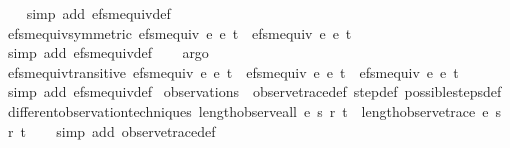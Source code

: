 \begin{isabellebody}
%
\isadelimproof
\ \ %
\endisadelimproof
%
\isatagproof
{}\isamarkupfalse%
\ {\isacharparenleft}simp\ add{\isacharcolon}\ efsm{\isacharunderscore}equiv{\isacharunderscore}def{\isacharparenright}%
\endisatagproof
{\isafoldproof}%
%
\isadelimproof
\isanewline
%
\endisadelimproof
\isanewline
{}\isamarkupfalse%
\ efsm{\isacharunderscore}equiv{\isacharunderscore}symmetric{\isacharcolon}\ {\isachardoublequoteopen}efsm{\isacharunderscore}equiv\ e{}\ e{}\ t\ {\isasymequiv}\ efsm{\isacharunderscore}equiv\ e{}\ e{}\ t{\isachardoublequoteclose}\isanewline
%
\isadelimproof
\ \ %
\endisadelimproof
%
\isatagproof
{}\isamarkupfalse%
\ {\isacharparenleft}simp\ add{\isacharcolon}\ efsm{\isacharunderscore}equiv{\isacharunderscore}def{\isacharparenright}\isanewline
\ \ \isamarkupfalse%
\ argo%
\endisatagproof
{\isafoldproof}%
%
\isadelimproof
\isanewline
%
\endisadelimproof
\isanewline
{}\isamarkupfalse%
\ efsm{\isacharunderscore}equiv{\isacharunderscore}transitive{\isacharcolon}\ {\isachardoublequoteopen}efsm{\isacharunderscore}equiv\ e{}\ e{}\ t\ {\isasymand}\ efsm{\isacharunderscore}equiv\ e{}\ e{}\ t\ {\isasymlongrightarrow}\ efsm{\isacharunderscore}equiv\ e{}\ e{}\ t{\isachardoublequoteclose}\isanewline
%
\isadelimproof
\ \ %
\endisadelimproof
%
\isatagproof
{}\isamarkupfalse%
\ {\isacharparenleft}simp\ add{\isacharcolon}\ efsm{\isacharunderscore}equiv{\isacharunderscore}def{\isacharparenright}%
\endisatagproof
{\isafoldproof}%
%
\isadelimproof
\isanewline
%
\endisadelimproof
\isanewline
{}\isamarkupfalse%
\ observations\ {\isacharequal}\ observe{\isacharunderscore}trace{\isacharunderscore}def\ step{\isacharunderscore}def\ possible{\isacharunderscore}steps{\isacharunderscore}def\isanewline
\isanewline
{}\isamarkupfalse%
\ different{\isacharunderscore}observation{\isacharunderscore}techniques{\isacharcolon}\ {\isachardoublequoteopen}length{\isacharparenleft}observe{\isacharunderscore}all\ e\ s\ r\ t{\isacharparenright}\ {\isacharequal}\ length{\isacharparenleft}observe{\isacharunderscore}trace\ e\ s\ r\ t{\isacharparenright}{\isachardoublequoteclose}\isanewline
%
\isadelimproof
\ \ %
\endisadelimproof
%
\isatagproof
{}\isamarkupfalse%
\ {\isacharparenleft}simp\ add{\isacharcolon}\ observe{\isacharunderscore}trace{\isacharunderscore}def{\isacharparenright}%
\endisatagproof
{\isafoldproof}%
%
\isadelimproof
\isanewline
%

\end{isabellebody}
